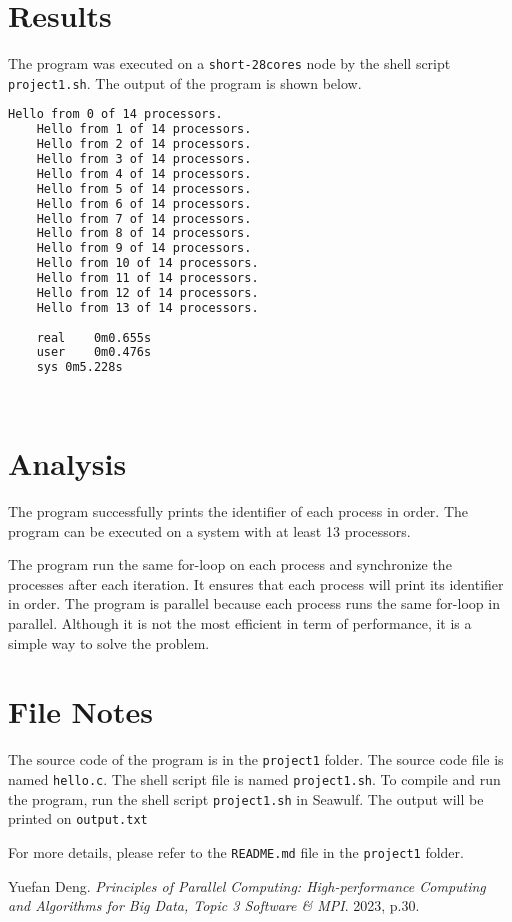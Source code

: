 \documentclass[12pt,a4paper]{article}
\begin{document}
\section{Results}
The program was executed on a \texttt{short-28cores} node by the shell script \texttt{project1.sh}. The output of the program is shown below.
\begin{lstlisting}[language=bash]
    Hello from 0 of 14 processors.
    Hello from 1 of 14 processors.
    Hello from 2 of 14 processors.
    Hello from 3 of 14 processors.
    Hello from 4 of 14 processors.
    Hello from 5 of 14 processors.
    Hello from 6 of 14 processors.
    Hello from 7 of 14 processors.
    Hello from 8 of 14 processors.
    Hello from 9 of 14 processors.
    Hello from 10 of 14 processors.
    Hello from 11 of 14 processors.
    Hello from 12 of 14 processors.
    Hello from 13 of 14 processors.
    
    real	0m0.655s
    user	0m0.476s
    sys	0m5.228s
    
    
\end{lstlisting}


\section{Analysis}
The program successfully prints the identifier of each process in order. 
The program can be executed on a system with at least 13 processors. 

The program run the same for-loop on each process and synchronize the processes after each iteration. 
It ensures that each process will print its identifier in order.
The program is parallel because each process runs the same for-loop in parallel.
Although it is not the most efficient in term of performance, it is a simple way to solve the problem.

\section*{File Notes}

The source code of the program is in the \texttt{project1} folder. The source code file is named \texttt{hello.c}. The shell script file is named \texttt{project1.sh}. To compile and run the program, run the shell script \texttt{project1.sh} in Seawulf. The output will be printed on \texttt{output.txt}

For more details, please refer to the \texttt{README.md} file in the \texttt{project1} folder.
\begin{thebibliography}{1}

    Yuefan Deng.
    \textit{Principles of Parallel Computing: High-performance Computing and Algorithms for Big Data, Topic 3 Software \& MPI}.
    2023, p.30.
    
\end{thebibliography}
\end{document}
